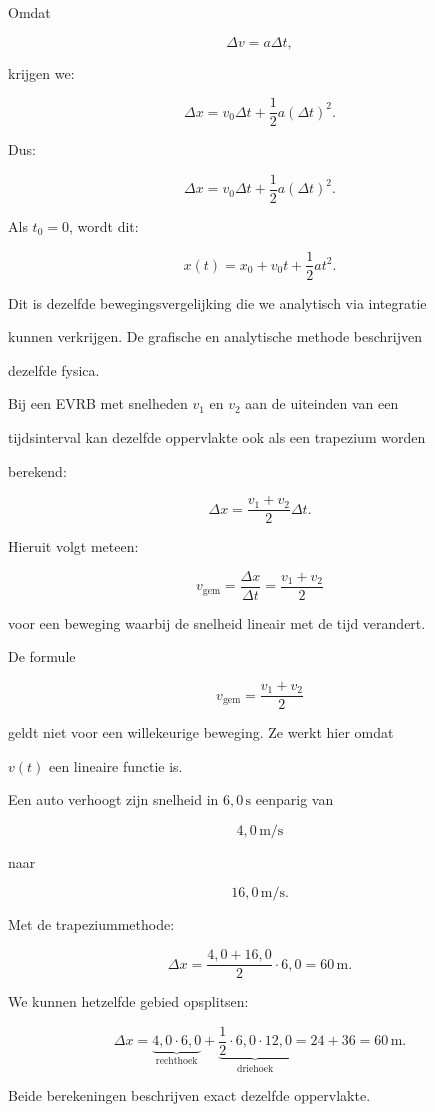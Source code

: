 \documentclass{ximera}
\begin{document}
Omdat

\[\Delta v=a\Delta t,\]

krijgen we:

\[\Delta x = v_0\Delta t + \frac12a(\Delta t)^2.\]

Dus:

\[\boxed{ \Delta x = v_0\Delta t+\frac12a(\Delta t)^2. }\]

Als $t_0=0$, wordt dit:

\[\boxed{ x(t) = x_0+v_0t+\frac12at^2. }\]

Dit is dezelfde bewegingsvergelijking die we analytisch via integratie

kunnen verkrijgen. De grafische en analytische methode beschrijven

dezelfde fysica.


Bij een EVRB met snelheden $v_1$ en $v_2$ aan de uiteinden van een

tijdsinterval kan dezelfde oppervlakte ook als een trapezium worden

berekend:

\[\boxed{ \Delta x = \frac{v_1+v_2}{2}\Delta t. }\]

Hieruit volgt meteen:

\[v_{\mathrm{gem}} = \frac{\Delta x}{\Delta t} = \boxed{\frac{v_1+v_2}{2}}\]

voor een beweging waarbij de snelheid lineair met de tijd verandert.

\begin{opmerking}

De formule

\[v_{\mathrm{gem}}=\frac{v_1+v_2}{2}\]

geldt niet voor een willekeurige beweging. Ze werkt hier omdat

$v(t)$ een lineaire functie is.

\end{opmerking}

\begin{voorbeeld}[Optrekken]

Een auto verhoogt zijn snelheid in $6,0\,\mathrm{s}$ eenparig van

\[4,0\,\mathrm{m/s}\]

naar

\[16,0\,\mathrm{m/s}.\]

Met de trapeziummethode:

\[\Delta x = \frac{4,0+16,0}{2}\cdot6,0 = 60\,\mathrm{m}.\]

We kunnen hetzelfde gebied opsplitsen:

\[\Delta x = \underbrace{4,0\cdot6,0}_{\text{rechthoek}} + \underbrace{\frac12\cdot6,0\cdot12,0}_{\text{driehoek}} = 24+36 = 60\,\mathrm{m}.\]

Beide berekeningen beschrijven exact dezelfde oppervlakte.

\end{voorbeeld}
\end{document}
